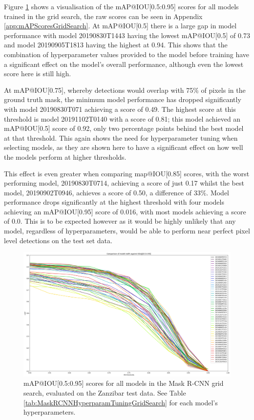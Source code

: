 Figure \ref{fig:mAP-graph} shows a visualisation of the mAP@IOU[0.5:0.95] scores for all models trained in the grid search, the raw scores can be seen in Appendix \ref{app:mAPScoresGridSearch}. At mAP@IOU[0.5] there is a large gap in model performance with model 20190830T1443 having the lowest mAP@IOU[0.5] of 0.73 and model 20190905T1813 having the highest at 0.94. This shows that the combination of hyperparameter values provided to the model before training have a significant effect on the model's overall performance, although even the lowest score here is still high. 

At mAP@IOU[0.75], whereby detections would overlap with 75\% of pixels in the ground truth mask, the minimum model performance has dropped significantly with model 20190830T071 achieving a score of 0.49. The highest score at this threshold is model 20191102T0140 with a score of 0.81; this model achieved an mAP@IOU[0.5] score of 0.92, only two percentage points behind the best model at that threshold. This again shows the need for hyperparameter tuning when selecting models, as they are shown here to have a significant effect on how well the models perform at higher thresholds.

This effect is even greater when comparing map@IOU[0.85] scores, with the worst performing model, 20190830T0714,  achieving a score of just 0.17 whilst the best model, 20190902T0946, achieves a score of 0.50, a difference of 33\%. Model performance drops significantly at the highest threshold with four models achieving an mAP@IOU[0.95] score of 0.016, with most models achieving a score of 0.0. This is to be expected however as it would be highly unlikely that any model, regardless of hyperparameters, would be able to perform near perfect pixel level detections on the test set data. 

\begin{figure}[h]
	\begin{center}
		\includegraphics[scale=0.3]{Chapter3/figs/comparison_graph_all_diff_colours.png}
	\end{center}
	\caption[mAP@IOU{[0.5:0.95]} scores for all models in the Mask R-CNN grid search, evaluated on the Zanzibar test data.]{mAP@IOU{[0.5:0.95]} scores for all models in the Mask R-CNN grid search, evaluated on the Zanzibar test data. See Table \ref{tab:MaskRCNNHyperparamTuningGridSearch} for each model's hyperparameters.}
	\label{fig:mAP-graph}
\end{figure}

